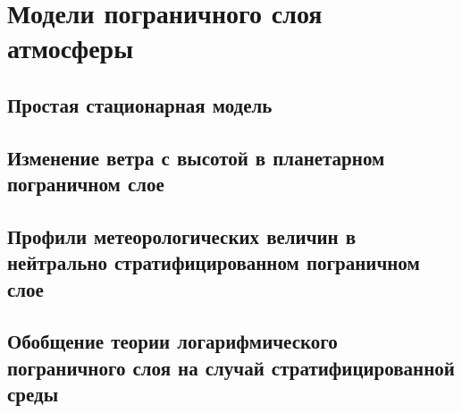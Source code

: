 \chapter{Модели пограничного слоя атмосферы}

\section{Простая стационарная модель}

\section{Изменение ветра с высотой в планетарном пограничном слое}

\section{Профили метеорологических величин в 
нейтрально стратифицированном пограничном слое}

\section{Обобщение теории логарифмического пограничного слоя на случай стратифицированной среды}

